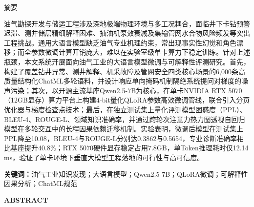 \documentclass[UTF8,a4paper,zihao=-4,openany,twoside]{ctexbook}
\newenvironment{abstract}{
    \cleardoublepage
    \pagestyle{plain}
    \pagenumbering{Roman}
    \begin{center}
        {\zihao{3}\heiti 摘\quad 要}
    \end{center}
    \vspace{2mm}
}{}
\begin{document}
\begin{abstract}
油气勘探开发与储运工程涉及深地极端物理环境与多工况耦合，面临井下卡钻预警迟滞、测井储层精细解释困难、抽油机泵效衰减及集输管网水合物风险频发等突出工程挑战。通用大语言模型缺乏油气专业机理约束，常出现事实性幻觉和角色漂移；而全参数微调计算开销庞大，难以在实验室级单卡算力下稳定训练。针对上述瓶颈，本文系统开展面向油气工业的大语言模型微调与可解释性评测研究。首先，构建了覆盖钻井异常、测井解释、机采故障及管网安全四类核心场景的6,000条高质量结构化ChatML多轮语料，并设计响应单向掩码机制隔绝系统提问对梯度的噪声污染；其次，以开源主流基座Qwen2.5-7B为核心，在单卡NVIDIA RTX 5070（12GB显存）算力平台上构建4-bit量化QLoRA参数高效微调管线，联合引入分页优化器与梯度检查点技术；最后，在独立测试集上量化评测模型困惑度（PPL）、BLEU-4、ROUGE-L、领域知识准确率，并通过跨轮次注意力热力图透视自回归模型在多轮交互中的长程因果依赖迁移机制。实验表明，微调后模型在测试集上PPL降至10.08，BLEU-4与ROUGE-L分别达0.3862与0.5654，专业诊断准确率相比基座提升40.8\%；RTX 5070硬件显存稳定占用7.8GB，单Token推理耗时仅12.14 ms，验证了单卡环境下垂直大模型工程落地的可行性与高可信度。

\vspace{4mm}
\noindent\textbf{关键词：}油气工业知识发现；大语言模型；Qwen2.5-7B；QLoRA微调；可解释性因果分析；ChatML规范
\end{abstract}

\cleardoublepage

\begin{center}
    {\rmfamily\bfseries ABSTRACT}
\end{center}
\vspace{2mm}
\end{document}
